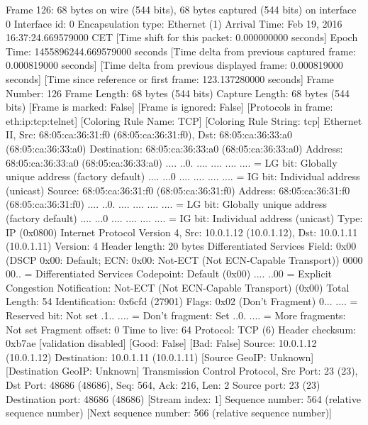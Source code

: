 Frame 126: 68 bytes on wire (544 bits), 68 bytes captured (544 bits) on interface 0
    Interface id: 0
    Encapsulation type: Ethernet (1)
    Arrival Time: Feb 19, 2016 16:37:24.669579000 CET
    [Time shift for this packet: 0.000000000 seconds]
    Epoch Time: 1455896244.669579000 seconds
    [Time delta from previous captured frame: 0.000819000 seconds]
    [Time delta from previous displayed frame: 0.000819000 seconds]
    [Time since reference or first frame: 123.137280000 seconds]
    Frame Number: 126
    Frame Length: 68 bytes (544 bits)
    Capture Length: 68 bytes (544 bits)
    [Frame is marked: False]
    [Frame is ignored: False]
    [Protocols in frame: eth:ip:tcp:telnet]
    [Coloring Rule Name: TCP]
    [Coloring Rule String: tcp]
Ethernet II, Src: 68:05:ca:36:31:f0 (68:05:ca:36:31:f0), Dst: 68:05:ca:36:33:a0 (68:05:ca:36:33:a0)
    Destination: 68:05:ca:36:33:a0 (68:05:ca:36:33:a0)
        Address: 68:05:ca:36:33:a0 (68:05:ca:36:33:a0)
        .... ..0. .... .... .... .... = LG bit: Globally unique address (factory default)
        .... ...0 .... .... .... .... = IG bit: Individual address (unicast)
    Source: 68:05:ca:36:31:f0 (68:05:ca:36:31:f0)
        Address: 68:05:ca:36:31:f0 (68:05:ca:36:31:f0)
        .... ..0. .... .... .... .... = LG bit: Globally unique address (factory default)
        .... ...0 .... .... .... .... = IG bit: Individual address (unicast)
    Type: IP (0x0800)
Internet Protocol Version 4, Src: 10.0.1.12 (10.0.1.12), Dst: 10.0.1.11 (10.0.1.11)
    Version: 4
    Header length: 20 bytes
    Differentiated Services Field: 0x00 (DSCP 0x00: Default; ECN: 0x00: Not-ECT (Not ECN-Capable Transport))
        0000 00.. = Differentiated Services Codepoint: Default (0x00)
        .... ..00 = Explicit Congestion Notification: Not-ECT (Not ECN-Capable Transport) (0x00)
    Total Length: 54
    Identification: 0x6cfd (27901)
    Flags: 0x02 (Don't Fragment)
        0... .... = Reserved bit: Not set
        .1.. .... = Don't fragment: Set
        ..0. .... = More fragments: Not set
    Fragment offset: 0
    Time to live: 64
    Protocol: TCP (6)
    Header checksum: 0xb7ae [validation disabled]
        [Good: False]
        [Bad: False]
    Source: 10.0.1.12 (10.0.1.12)
    Destination: 10.0.1.11 (10.0.1.11)
    [Source GeoIP: Unknown]
    [Destination GeoIP: Unknown]
Transmission Control Protocol, Src Port: 23 (23), Dst Port: 48686 (48686), Seq: 564, Ack: 216, Len: 2
    Source port: 23 (23)
    Destination port: 48686 (48686)
    [Stream index: 1]
    Sequence number: 564    (relative sequence number)
    [Next sequence number: 566    (relative sequence number)]
